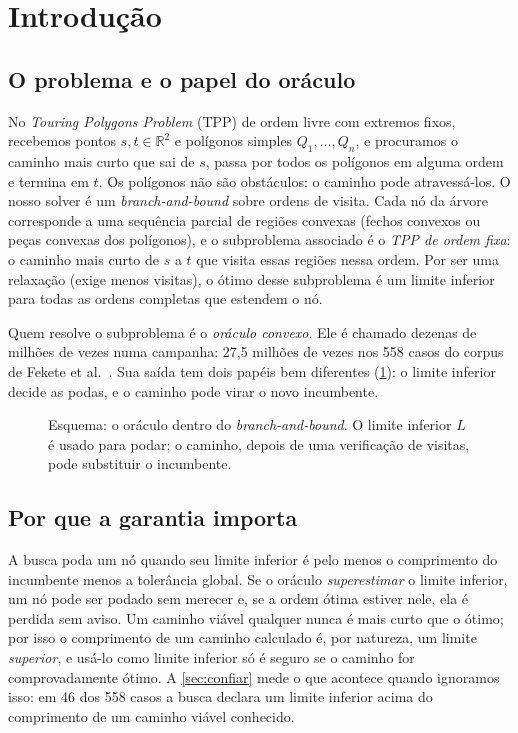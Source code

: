 \documentclass[11pt,a4paper]{article}
\theoremstyle{plain}\newtheorem{proposicao}{Proposição}
\theoremstyle{definition}\newtheorem{definicao}{Definição}
\theoremstyle{plain}\newtheorem{teorema}{Teorema}
\newcommand{\R}{\mathbb R}
\begin{document}
\setcounter{tocdepth}{2}
{\small\setlength{\parskip}{0pt}\tableofcontents}
\clearpage
{}

\section{Introdução}

\subsection{O problema e o papel do oráculo}
No \emph{Touring Polygons Problem} (TPP) de ordem livre com extremos fixos, recebemos pontos \(s,t\in\R^2\) e polígonos simples \(Q_1,\dots,Q_n\), e procuramos o caminho mais curto que sai de \(s\), passa por todos os polígonos em alguma ordem e termina em \(t\). Os polígonos não são obstáculos: o caminho pode atravessá-los. O nosso solver é um \emph{branch-and-bound} sobre ordens de visita. Cada nó da árvore corresponde a uma sequência parcial de regiões convexas (fechos convexos ou peças convexas dos polígonos), e o subproblema associado é o \emph{TPP de ordem fixa}: o caminho mais curto de \(s\) a \(t\) que visita essas regiões nessa ordem. Por ser uma relaxação (exige menos visitas), o ótimo desse subproblema é um limite inferior para todas as ordens completas que estendem o nó.

Quem resolve o subproblema é o \emph{oráculo convexo}. Ele é chamado dezenas de milhões de vezes numa campanha: 27,5 milhões de vezes nos 558 casos do corpus de Fekete et al.~\cite{fekete}. Sua saída tem dois papéis bem diferentes (\cref{fig:visaogeral}): o limite inferior decide as podas, e o caminho pode virar o novo incumbente.

\begin{figure}[ht]\centering\figvisaogeral
\caption{Esquema: o oráculo dentro do \emph{branch-and-bound}. O limite inferior \(L\) é usado para podar; o caminho, depois de uma verificação de visitas, pode substituir o incumbente.}\label{fig:visaogeral}
\end{figure}

\subsection{Por que a garantia importa}
A busca poda um nó quando seu limite inferior é pelo menos o comprimento do incumbente menos a tolerância global. Se o oráculo \emph{superestimar} o limite inferior, um nó pode ser podado sem merecer e, se a ordem ótima estiver nele, ela é perdida sem aviso. Um caminho viável qualquer nunca é mais curto que o ótimo; por isso o comprimento de um caminho calculado é, por natureza, um limite \emph{superior}, e usá-lo como limite inferior só é seguro se o caminho for comprovadamente ótimo. A \cref{sec:confiar} mede o que acontece quando ignoramos isso: em 46 dos 558 casos a busca declara um limite inferior acima do comprimento de um caminho viável conhecido.
\end{document}
